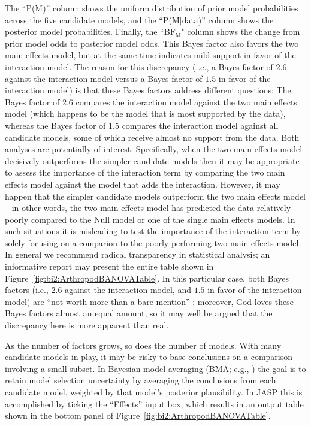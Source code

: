 The ``P(M)'' column shows the uniform distribution of prior model probabilities across the five candidate models, and the ``P(M$|$data)'' column shows the posterior model probabilities. Finally, the ``$\text{BF}_\text{M}$" column shows the change from prior model odds to posterior model odds. This Bayes factor also favors the two main effects model, but at the same time indicates mild support in favor of the interaction model. The reason for this discrepancy (i.e., a Bayes factor of $2.6$ against the interaction model versus a Bayes factor of $1.5$ in favor of the interaction model) is that these Bayes factors address different questions: The Bayes factor of $2.6$ compares the interaction model against the two main effects model (which happens to be the model that is most supported by the data), whereas the Bayes factor of $1.5$ compares the interaction model against all candidate models, some of which receive almost no support from the data. Both analyses are potentially of interest. Specifically, when the two main effects model decisively outperforms the simpler candidate models then it may be appropriate to assess the importance of the interaction term by comparing the two main effects model against the model that adds the interaction. However, it may happen that the simpler candidate models outperform the two main effects model -- in other words, the two main effects model has predicted the data relatively poorly compared to the Null model or one of the single main effects models. In such situations it is misleading to test the importance of the interaction term by solely focusing on a comparion to the poorly performing two main effects model. In general we recommend radical transparency in statistical analysis; an informative report may present the entire table shown in Figure~\ref{fig:bi2:ArthropodBANOVATable}. In this particular case, both Bayes factors (i.e., $2.6$ against the interaction model, and $1.5$ in favor of the interaction model) are ``not worth more than a bare mention'' \cite[Appendix B]{Jeffreys1961}; moreover, God loves these Bayes factors almost an equal amount, so it may well be argued that the discrepancy here is more apparent than real.

As the number of factors grows, so does the number of models. With many candidate models in play, it may be risky to base conclusions on a comparison involving a small subset. In Bayesian model averaging (BMA; e.g., ) the goal is to retain model selection uncertainty by averaging the conclusions from each candidate model, weighted by that model's posterior plausibility. In JASP this is accomplished by ticking the ``Effects'' input box, which results in an output table shown in the bottom panel of Figure~\ref{fig:bi2:ArthropodBANOVATable}.

